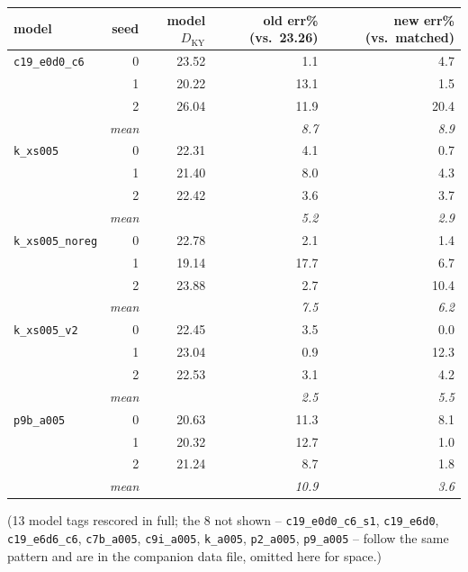 \documentclass[11pt]{article}
\begin{document}
\begin{center}
\small
\begin{tabular}{lrrrr}
\toprule
model & seed & model $D_{\mathrm{KY}}$ & old err\% (vs.\ 23.26) & new err\% (vs.\ matched) \\
\midrule
\texttt{c19\_e0d0\_c6}     & 0 & 23.52 & 1.1  & 4.7  \\
                            & 1 & 20.22 & 13.1 & 1.5  \\
                            & 2 & 26.04 & 11.9 & 20.4 \\
                            & \textit{mean} & & \textit{8.7} & \textit{8.9} \\
\texttt{k\_xs005}          & 0 & 22.31 & 4.1  & 0.7  \\
                            & 1 & 21.40 & 8.0  & 4.3  \\
                            & 2 & 22.42 & 3.6  & 3.7  \\
                            & \textit{mean} & & \textit{5.2} & \textit{2.9} \\
\texttt{k\_xs005\_noreg}   & 0 & 22.78 & 2.1  & 1.4  \\
                            & 1 & 19.14 & 17.7 & 6.7  \\
                            & 2 & 23.88 & 2.7  & 10.4 \\
                            & \textit{mean} & & \textit{7.5} & \textit{6.2} \\
\texttt{k\_xs005\_v2}      & 0 & 22.45 & 3.5  & 0.0  \\
                            & 1 & 23.04 & 0.9  & 12.3 \\
                            & 2 & 22.53 & 3.1  & 4.2  \\
                            & \textit{mean} & & \textit{2.5} & \textit{5.5} \\
\texttt{p9b\_a005}         & 0 & 20.63 & 11.3 & 8.1  \\
                            & 1 & 20.32 & 12.7 & 1.0  \\
                            & 2 & 21.24 & 8.7  & 1.8  \\
                            & \textit{mean} & & \textit{10.9} & \textit{3.6} \\
\bottomrule
\end{tabular}
\end{center}
(13 model tags rescored in full; the 8 not shown -- \texttt{c19\_e0d0\_c6\_s1},
\texttt{c19\_e6d0}, \texttt{c19\_e6d6\_c6}, \texttt{c7b\_a005},
\texttt{c9i\_a005}, \texttt{k\_a005}, \texttt{p2\_a005}, \texttt{p9\_a005}
-- follow the same pattern and are in the companion data file, omitted
here for space.)
\end{document}
